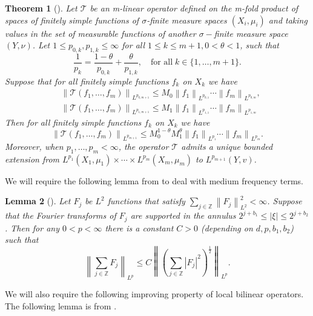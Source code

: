 \documentclass[a4paper,reqno]{amsart}
\newcommand{\Z}{{\mathbb Z}}
\newtheorem{theorem}{Theorem}[section]
\newtheorem{lemma}[theorem]{Lemma}
\theoremstyle{definition}
\numberwithin{equation}{section}
\begin{document}
\begin{theorem}[\cite{GrafakosmodernFA}]\label{complexinterpolation}
	Let $\mathcal{T}$ be an m-linear operator defined on the m-fold product of spaces of finitely simple functions of $\sigma$-finite measure spaces $\left(X_i, \mu_i\right)$ and taking values in the set of measurable functions of another $\sigma-$finite measure space $(Y,\nu)$. Let $1 \leq p_{0, k}, p_{1, k}\leq \infty$ for all $1 \leq k \leq m+1, 0<\theta<1$, such that
	\[\frac{1}{p_k}=\frac{1-\theta}{p_{0, k}}+\frac{\theta}{p_{1, k}},\quad\text{for all}\;k \in\{1, \ldots, m+1\}.\]
	Suppose that for all finitely simple functions $f_k$ on $X_k$ we have
	\begin{align*}
		&\left\|\mathcal{T}\left(f_1, \ldots, f_m\right)\right\|_{L^{p_{0,m+1}}} \leq M_0\left\|f_1\right\|_{L^{p_{0,1}}} \cdots\left\|f_m\right\|_{L^{p_{0, m}}}, \\
		&\left\|\mathcal{T}\left(f_1, \ldots, f_m\right)\right\|_{L^{p_{1,m+1}}} \leq M_1\left\|f_1\right\|_{L^{p_{1,1}}} \cdots\left\|f_m\right\|_{L^{p_{1, m}}}
	\end{align*}
	Then for all finitely simple functions $f_k$ on $X_k$ we have
	\[\left\|\mathcal{T}\left(f_1, \ldots, f_m\right)\right\|_{L^{p_{m+1}}} \leq M_0^{1-\theta} M_1^\theta\left\|f_1\right\|_{L^{p_1}} \cdots\left\|f_m\right\|_{L^{p_m}}.\]
	Moreover, when $p_1, \ldots, p_m<\infty$, the operator $\mathcal{T}$ admits a unique bounded extension from $L^{p_1}\left(X_1, \mu_1\right) \times \cdots \times L^{p_m}\left(X_m, \mu_m\right)$ to $L^{p_{m+1}}(Y, v)$.
\end{theorem}
We will require the following lemma from \cite[Lemma 7.5.2(b)]{GrafakosmodernFA} to deal with medium frequency terms.
\begin{lemma}[\cite{GrafakosmodernFA}]\label{lemma:GrafMedium}
	Let $F_j$ be $L^2$ functions that satisfy $\sum_{j \in \Z}\left\|F_j\right\|_{L^2}^2<\infty$. Suppose that the Fourier transforms of $F_j$ are supported in the annulus $2^{j+b_1} \leq|\xi| \leq 2^{j+b_2}$. Then for any $0<p<\infty$ there is a constant $C>0$ (depending on $d,p,b_1,b_2$) such that
	\[\left\|\sum_{j \in \Z} F_j\right\|_{L^p} \leq C\left\|\left(\sum_{j \in \Z}\left|F_j\right|^2\right)^{\frac{1}{2}}\right\|_{L^p}.\]
\end{lemma}
We will also require the following improving property of local bilinear operators. The following lemma is from \cite[Proposition 4.1]{IPS}.
\end{document}
